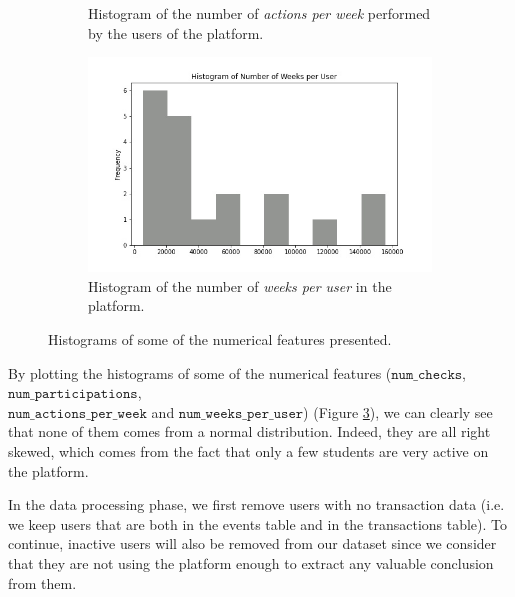 \documentclass[sigplan,screen]{acmart}
\begin{document}
\begin{figure}
\begin{subfigure}[b]{\linewidth}
         \caption{Histogram of the number of \emph{actions per week} performed by the users of the platform.}
         \label{fig:actions_per_week}
     \end{subfigure}
     \hfill
     \begin{subfigure}[b]{\linewidth}
         \centering
         \includegraphics[width=0.82\linewidth]{reports/figures/histogram_number_of_weeks_per_user.jpg}
         \caption{Histogram of the number of \emph{weeks per user} in the platform.}
         \label{fig:weeks_per_user}
     \end{subfigure}
        \caption{Histograms of some of the numerical features presented.}
        \label{fig:histograms}
\end{figure}

By plotting the histograms of some of the numerical features ($\texttt{num\_checks}$, $\texttt{num\_participations}$, \\ $\texttt{num\_actions\_per\_week}$ and $\texttt{num\_weeks\_per\_user}$) (Figure \ref{fig:histograms}), we can clearly see that none of them comes from a normal distribution. Indeed, they are all right skewed, which comes from the fact that only a few students are very active on the platform.

In the data processing phase, we first remove users with no transaction data (i.e. we keep users that are both in the events table and in the transactions table). To continue, inactive users will also be removed from our dataset since we consider that they are not using the platform enough to extract any valuable conclusion from them.
\end{document}
